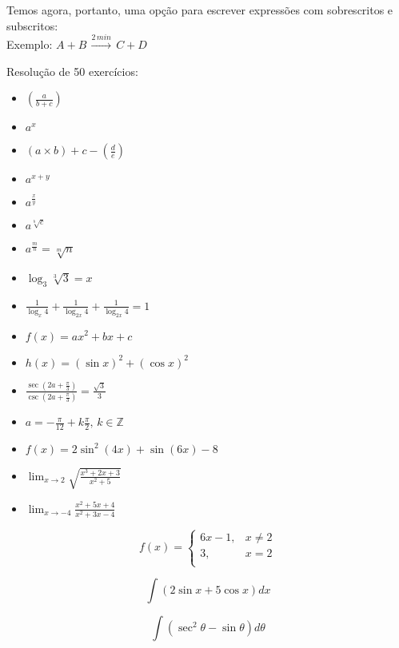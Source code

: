 \documentclass[a4paper, 12pt]{article}
\begin{document}
Temos agora, portanto, uma opção para escrever expressões com sobrescritos e subscritos:\\


Exemplo: $A + B\, \stackrel{2\,min}{\longrightarrow}\, C + D$

\vspace{0.5cm}

Resolução de 50 exercícios:
\begin{itemize}
\item $\left(\frac{a}{b + c}\right)$
\item $a^{x}$
\item $(a \times b) + c - \left(\frac{d}{e}\right)$
\item $a^{x+y}$
\item $a^{\frac{x}{y}}$
\item $a^{\sqrt[b]{c}}$
\item $a^{\frac{m}{n}} = \sqrt[m]{n}$
\item $\log_{3}\sqrt[3]{3} = x$
\item $\frac{1}{\log_{x}4} + \frac{1}{\log_{2x}4} + \frac{1}{\log_{2x}4} = 1$
\item $f(x) = ax^{2} + bx + c$
\item $h(x) = (\sin x)^2 + (\cos x)^2$
\item $\frac{\sec\left(2a + \frac{\pi}{3}\right)}{\csc\left(2a + \frac{\pi}{3}\right)} = \frac{\sqrt{3}}{3}$
\item $a = -\frac{\pi}{12} + k\frac{\pi}{2},\, k \in \mathbb{Z}$
\item $f(x) = 2\sin^{2}(4x) + \sin(6x) - 8$
\item $\lim_{x \rightarrow 2} \sqrt{\frac{x^{3} + 2x + 3}{x^{2} + 5}}$
\item $\lim_{x \rightarrow -4} \frac{x^{2} + 5x + 4}{x^{2} + 3x - 4}$
\end{itemize}

\begin{equation}
f(x) =
\left\lbrace
\begin{array}{cc}
6x - 1, & x \neq 2\\
3, & x = 2\\ 
\end{array}
\right.
\end{equation}

\begin{equation}
\int(2\sin x + 5\cos x)dx
\end{equation}

\begin{equation}
\int\left(\sec^{2} \theta - \sin \theta\right)d\theta
\end{equation}
\end{document}

